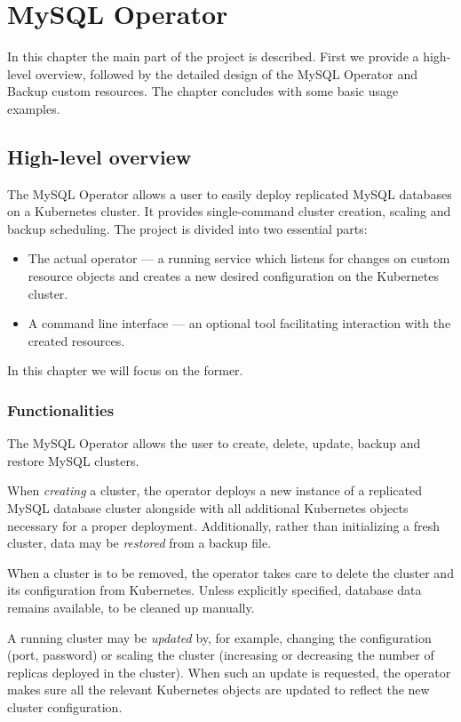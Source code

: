 \chapter{MySQL Operator}

In this chapter the main part of the project is described. First we provide 
a high-level overview, followed by the detailed design of the MySQL Operator 
and Backup custom resources. The chapter concludes with some basic usage examples.

\section{High-level overview}
The MySQL Operator allows a user to easily deploy replicated MySQL databases on a Kubernetes cluster.
It provides single-command cluster creation, scaling and backup scheduling. The project is divided
into two essential parts:
\begin{itemize}
	\item The actual operator --- a running service which listens for changes on custom resource
	objects and creates a new desired configuration on the Kubernetes cluster.
	\item A command line interface --- an optional tool facilitating interaction with the created
	resources.
\end{itemize}

In this chapter we will focus on the former.

\subsection{Functionalities}
The MySQL Operator allows the user to create, delete, update, backup and restore MySQL clusters.

When \textit{creating} a cluster, the operator deploys a new instance of a replicated MySQL
database cluster alongside with all additional Kubernetes objects necessary for a proper deployment.
Additionally, rather than initializing a fresh cluster, data may be \textit{restored} from a backup file.

When a cluster is to be removed, the operator takes care to delete the cluster and its
configuration from Kubernetes. Unless explicitly specified, database data remains available, to be
cleaned up manually.

A running cluster may be \textit{updated} by, for example, changing the configuration (port,
password) or scaling the cluster (increasing or decreasing the number of replicas deployed in the
cluster). When such an update is requested, the operator makes sure all the relevant Kubernetes
objects are updated to reflect the new cluster configuration.

